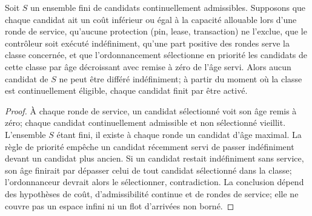 \begin{proposition}
Soit $S$ un ensemble fini de candidats continuellement admissibles. Supposons que chaque candidat ait un coût inférieur ou égal à la capacité allouable lors d'une ronde de service, qu'aucune protection (pin, lease, transaction) ne l'exclue, que le contrôleur soit exécuté indéfiniment, qu'une part positive des rondes serve la classe concernée, et que l'ordonnancement sélectionne en priorité les candidats de cette classe par âge décroissant avec remise à zéro de l'âge servi. Alors aucun candidat de $S$ ne peut être différé indéfiniment; à partir du moment où la classe est continuellement éligible, chaque candidat finit par être activé.
\end{proposition}
\begin{proof}
À chaque ronde de service, un candidat sélectionné voit son âge remis à zéro; chaque candidat continuellement admissible et non sélectionné vieillit. L'ensemble $S$ étant fini, il existe à chaque ronde un candidat d'âge maximal. La règle de priorité empêche un candidat récemment servi de passer indéfiniment devant un candidat plus ancien. Si un candidat restait indéfiniment sans service, son âge finirait par dépasser celui de tout candidat sélectionné dans la classe; l'ordonnanceur devrait alors le sélectionner, contradiction. La conclusion dépend des hypothèses de coût, d'admissibilité continue et de rondes de service; elle ne couvre pas un espace infini ni un flot d'arrivées non borné.
\end{proof}
